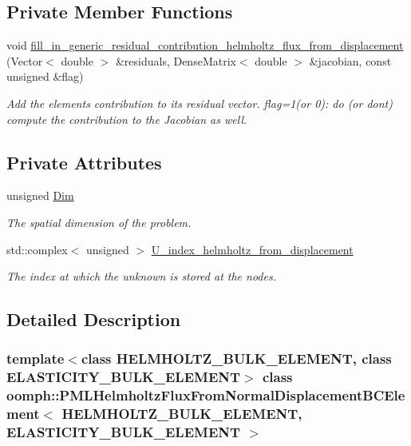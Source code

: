 \subsection*{Private Member Functions}
\begin{DoxyCompactItemize}
\item 
void \hyperlink{classoomph_1_1PMLHelmholtzFluxFromNormalDisplacementBCElement_a1efff41871abb12efe479ee7434b93b5}{fill\+\_\+in\+\_\+generic\+\_\+residual\+\_\+contribution\+\_\+helmholtz\+\_\+flux\+\_\+from\+\_\+displacement} (Vector$<$ double $>$ \&residuals, Dense\+Matrix$<$ double $>$ \&jacobian, const unsigned \&flag)
\begin{DoxyCompactList}\small\item\em Add the element\textquotesingle{}s contribution to its residual vector. flag=1(or 0)\+: do (or don\textquotesingle{}t) compute the contribution to the Jacobian as well. \end{DoxyCompactList}\end{DoxyCompactItemize}
\subsection*{Private Attributes}
\begin{DoxyCompactItemize}
\item 
unsigned \hyperlink{classoomph_1_1PMLHelmholtzFluxFromNormalDisplacementBCElement_a61904b123c934fd59b5c72f626ebb728}{Dim}
\begin{DoxyCompactList}\small\item\em The spatial dimension of the problem. \end{DoxyCompactList}\item 
std\+::complex$<$ unsigned $>$ \hyperlink{classoomph_1_1PMLHelmholtzFluxFromNormalDisplacementBCElement_aa80b2b79bd3c63f8d7c7f91d97fd22fc}{U\+\_\+index\+\_\+helmholtz\+\_\+from\+\_\+displacement}
\begin{DoxyCompactList}\small\item\em The index at which the unknown is stored at the nodes. \end{DoxyCompactList}\end{DoxyCompactItemize}


\subsection{Detailed Description}
\subsubsection*{template$<$class H\+E\+L\+M\+H\+O\+L\+T\+Z\+\_\+\+B\+U\+L\+K\+\_\+\+E\+L\+E\+M\+E\+NT, class E\+L\+A\+S\+T\+I\+C\+I\+T\+Y\+\_\+\+B\+U\+L\+K\+\_\+\+E\+L\+E\+M\+E\+NT$>$\newline
class oomph\+::\+P\+M\+L\+Helmholtz\+Flux\+From\+Normal\+Displacement\+B\+C\+Element$<$ H\+E\+L\+M\+H\+O\+L\+T\+Z\+\_\+\+B\+U\+L\+K\+\_\+\+E\+L\+E\+M\+E\+N\+T, E\+L\+A\+S\+T\+I\+C\+I\+T\+Y\+\_\+\+B\+U\+L\+K\+\_\+\+E\+L\+E\+M\+E\+N\+T $>$}

